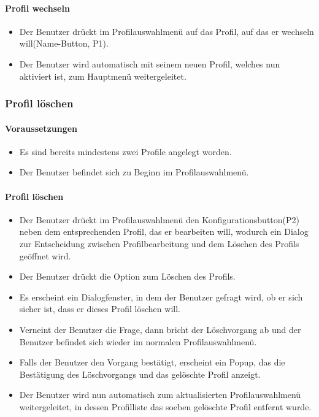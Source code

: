 \paragraph{Profil wechseln}
\begin{itemize}
	\item Der Benutzer drückt im Profilauswahlmenü auf das Profil, auf das er wechseln will(Name-Button, P1).
	\item Der Benutzer wird automatisch mit seinem neuen Profil, welches nun aktiviert ist, zum Hauptmenü weitergeleitet.
\end{itemize}

\subsubsection{Profil löschen}
\paragraph{Voraussetzungen}
\begin{itemize}
	\item Es sind bereits mindestens zwei Profile angelegt worden.
	\item Der Benutzer befindet sich zu Beginn im Profilauswahlmenü.
\end{itemize}
\paragraph{Profil löschen}
\begin{itemize}
	\item Der Benutzer drückt im Profilauswahlmenü den Konfigurationsbutton(P2) neben dem entsprechenden Profil, das er bearbeiten will, wodurch ein Dialog zur Entscheidung zwischen Profilbearbeitung und dem Löschen des Profils geöffnet wird.
	\item Der Benutzer drückt die Option zum Löschen des Profils.
	\item Es erscheint ein Dialogfenster, in dem der Benutzer gefragt wird, ob er sich sicher ist, dass er dieses Profil löschen will.
	\item Verneint der Benutzer die Frage, dann bricht der Löschvorgang ab und der Benutzer befindet sich wieder im normalen Profilauswahlmenü.
	\item Falls der Benutzer den Vorgang bestätigt, erscheint ein Popup, das die Bestätigung des Löschvorgangs und das gelöschte Profil anzeigt.
	\item Der Benutzer wird nun automatisch zum aktualisierten Profilauswahlmenü weitergeleitet, in dessen Profilliste das soeben gelöschte Profil entfernt wurde.
\end{itemize}

